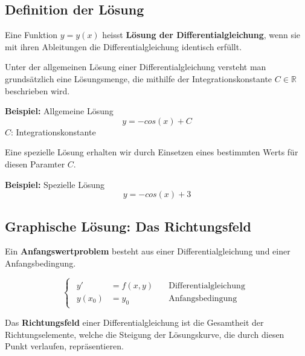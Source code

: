 \documentclass[10pt,a4paper]{article}
\begin{document}
\subsection{Definition der Lösung}
\begin{Definitionsbox}
  Eine Funktion $y = y(x)$ heisst \textbf{Lösung der Differentialgleichung}, wenn sie mit ihren Ableitungen die Differentialgleichung identisch erfüllt.
\end{Definitionsbox}
Unter der allgemeinen Lösung einer Differentialgleichung versteht man grundsätzlich eine Lösungsmenge, die mithilfe der Integrationskonstante $C \in \mathbb{R}$ beschrieben wird.
\begin{mdframed}
  \textbf{Beispiel:} Allgemeine Lösung
  \begin{equation*}
    y = - cos(x) + C
  \end{equation*}
  $C$: Integrationskonstante
\end{mdframed}
Eine spezielle Lösung erhalten wir durch Einsetzen eines bestimmten Werts für diesen Paramter $C$.
\begin{mdframed}
  \textbf{Beispiel:} Spezielle Lösung
  \begin{equation*}
    y = - cos(x) + 3
  \end{equation*}
\end{mdframed}

\subsection{Graphische Lösung: Das Richtungsfeld}
\begin{Definitionsbox}
  Ein \textbf{Anfangswertproblem} besteht aus einer Differentialgleichung und einer Anfangsbedingung.
\end{Definitionsbox}

\begin{equation*}
  \begin{cases}
    \begin{aligned}
      y' &= f(x,y) \quad &\text{Differentialgleichung}\\ 
      y(x_0) &= y_0 \quad &\text{Anfangsbedingung}
    \end{aligned}
  \end{cases}
\end{equation*}

\begin{Definitionsbox}
  Das \textbf{Richtungsfeld} einer Differentialgleichung ist die Gesamtheit der Richtungselemente, welche die Steigung der Lösungskurve, die durch diesen Punkt verlaufen, repräsentieren.
\end{Definitionsbox}
\end{document}
